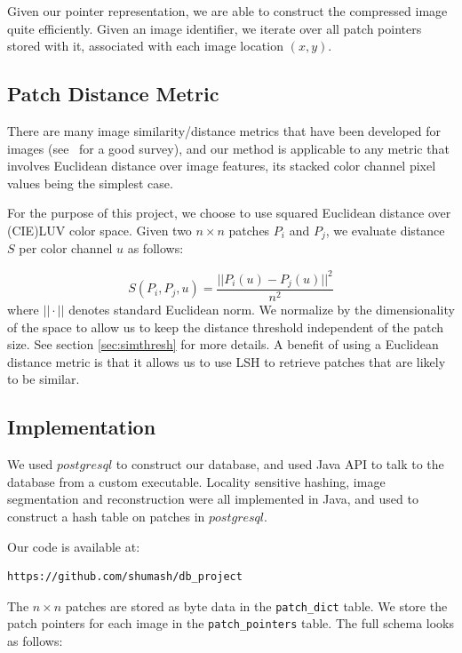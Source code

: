 Given our pointer representation, we are able to construct the compressed image quite efficiently.  Given an image identifier, we iterate over all patch pointers stored with it, associated with each image location $(x,y)$.

\subsection{Patch Distance Metric}\label{sec:sim}
There are many image similarity/distance metrics that have been developed for
images (see~\cite{yasmin2013use} for a good survey), and
our method is applicable to any metric that involves Euclidean
distance over image features, its stacked color channel pixel values
being the simplest case.

For the purpose of this project, we choose to use squared Euclidean
distance over (CIE)LUV color space.
Given two $n \times n$ patches $P_i$ and $P_j$, we evaluate distance $S$
per color channel $u$ as follows:

\begin{displaymath}
S(P_i, P_j, u) = \frac{||P_i(u) - P_j(u)||^2}{n^2}
\end{displaymath}
where $||\cdot||$ denotes standard Euclidean norm.
We normalize by the dimensionality of the space to allow us to keep the
distance threshold independent of the patch size. See section \ref{sec:simthresh} for more details.  A benefit of using a Euclidean distance metric is that it allows us to use LSH to retrieve patches that are likely to be similar.


\subsection{Implementation}\label{sec:impl}
We used $postgresql$ to construct our database, and used
Java API to talk to the database from a custom executable. Locality
sensitive hashing, image segmentation and reconstruction were
all implemented in Java, and used to construct a hash table
on patches in $postgresql$.

Our code is available at:
\begin{verbatim}
https://github.com/shumash/db_project
\end{verbatim}


The $n \times n$ patches are stored as byte data in the \texttt{patch\_dict} table.
We store the patch pointers for
each image in the \texttt{patch\_pointers} table. The full schema looks as follows:

